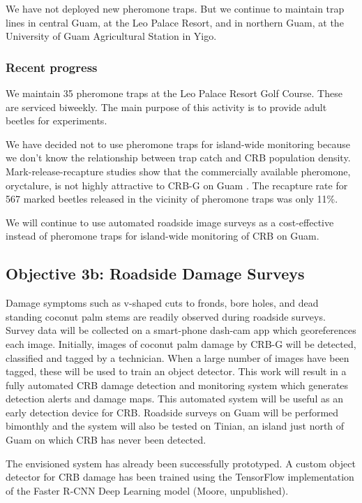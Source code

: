 \documentclass[12pt,letterpaper,english,bibliography=totocnumbered, abstract=on]{scrartcl}
\begin{document}
We have not deployed new pheromone traps. But we continue to maintain trap lines in central Guam, at the Leo Palace Resort, and in northern Guam, at the University of Guam Agricultural Station in Yigo.

\subsubsection{Recent progress}

We maintain 35 pheromone traps at the Leo Palace Resort Golf Course. These are serviced biweekly. The main purpose of this activity is to provide adult beetles for experiments.

We have decided not to use pheromone traps for island-wide monitoring because we don't know the relationship between trap catch and CRB population density. Mark-release-recapture studies show that the commercially available pheromone, oryctalure, is not highly attractive to CRB-G on Guam \cite{siderhurstEffectsUltravioletLight2021}. The recapture rate for 567 marked beetles released in the vicinity of pheromone traps was only 11\%.

We will continue to use automated roadside image surveys as a cost-effective instead of pheromone traps for island-wide monitoring of CRB on Guam. 

\clearpage
\subsection{Objective 3b: Roadside Damage Surveys}

\begin{framed}
Damage symptoms such as v-shaped cuts to fronds, bore holes, and dead standing coconut palm stems are readily observed during roadside surveys. Survey data will be collected on a smart-phone dash-cam app which georeferences each image. Initially, images of coconut palm damage by CRB-G will be detected, classified and tagged by a technician. When a large number of images have been tagged, these will be used to train an object detector. This work will result in a fully automated CRB damage detection and monitoring system which generates detection alerts and damage maps. This automated system will be useful as an early detection device for CRB. Roadside surveys on Guam will be performed bimonthly and the system will also be tested on Tinian, an island just north of Guam on which CRB has never been detected.

The envisioned system has already been successfully prototyped. A custom object detector for CRB damage has been trained using the TensorFlow implementation of the Faster R-CNN Deep Learning model (Moore, unpublished).
\end{framed}
\end{document}
